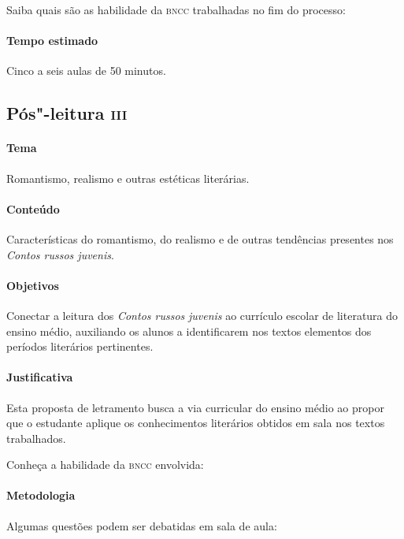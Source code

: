 \documentclass[11pt]{extarticle}
\begin{document}
Saiba quais são as habilidade da \textsc{bncc} trabalhadas no fim do processo:

\paragraph{Tempo estimado} Cinco a seis aulas de 50 minutos.


\subsection{Pós"-leitura \textsc{iii}}

\paragraph{Tema} Romantismo, realismo e outras estéticas literárias.

\paragraph{Conteúdo}
Características do romantismo, do realismo e de outras tendências
presentes nos \emph{Contos russos juvenis}.

\paragraph{Objetivos}
Conectar a leitura dos \emph{Contos russos} \emph{juvenis} ao currículo
escolar de literatura do ensino médio, auxiliando os alunos a
identificarem nos textos elementos dos períodos literários pertinentes.

\paragraph{Justificativa}
Esta proposta de letramento busca a via curricular do ensino médio ao
propor que o estudante aplique os conhecimentos literários obtidos em
sala nos textos trabalhados.

Conheça a habilidade da \textsc{bncc} envolvida:

\paragraph{Metodologia}
Algumas questões podem ser debatidas em sala de aula:
\end{document}
